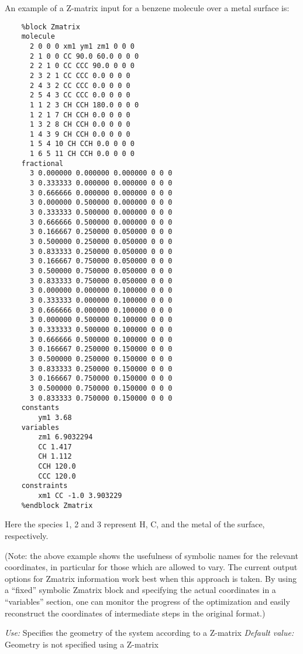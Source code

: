 \documentclass[11pt]{article}
\begin{document}
\begin{description}
An example of a Z-matrix input for a benzene molecule over a metal surface is:
\begin{verbatim}
    %block Zmatrix
    molecule
      2 0 0 0 xm1 ym1 zm1 0 0 0
      2 1 0 0 CC 90.0 60.0 0 0 0
      2 2 1 0 CC CCC 90.0 0 0 0
      2 3 2 1 CC CCC 0.0 0 0 0
      2 4 3 2 CC CCC 0.0 0 0 0
      2 5 4 3 CC CCC 0.0 0 0 0
      1 1 2 3 CH CCH 180.0 0 0 0
      1 2 1 7 CH CCH 0.0 0 0 0
      1 3 2 8 CH CCH 0.0 0 0 0
      1 4 3 9 CH CCH 0.0 0 0 0
      1 5 4 10 CH CCH 0.0 0 0 0
      1 6 5 11 CH CCH 0.0 0 0 0
    fractional
      3 0.000000 0.000000 0.000000 0 0 0
      3 0.333333 0.000000 0.000000 0 0 0
      3 0.666666 0.000000 0.000000 0 0 0
      3 0.000000 0.500000 0.000000 0 0 0
      3 0.333333 0.500000 0.000000 0 0 0
      3 0.666666 0.500000 0.000000 0 0 0
      3 0.166667 0.250000 0.050000 0 0 0
      3 0.500000 0.250000 0.050000 0 0 0
      3 0.833333 0.250000 0.050000 0 0 0
      3 0.166667 0.750000 0.050000 0 0 0
      3 0.500000 0.750000 0.050000 0 0 0
      3 0.833333 0.750000 0.050000 0 0 0
      3 0.000000 0.000000 0.100000 0 0 0
      3 0.333333 0.000000 0.100000 0 0 0
      3 0.666666 0.000000 0.100000 0 0 0
      3 0.000000 0.500000 0.100000 0 0 0
      3 0.333333 0.500000 0.100000 0 0 0
      3 0.666666 0.500000 0.100000 0 0 0
      3 0.166667 0.250000 0.150000 0 0 0
      3 0.500000 0.250000 0.150000 0 0 0
      3 0.833333 0.250000 0.150000 0 0 0
      3 0.166667 0.750000 0.150000 0 0 0
      3 0.500000 0.750000 0.150000 0 0 0
      3 0.833333 0.750000 0.150000 0 0 0
    constants
        ym1 3.68
    variables
        zm1 6.9032294
        CC 1.417
        CH 1.112
        CCH 120.0
        CCC 120.0
    constraints
        xm1 CC -1.0 3.903229
    %endblock Zmatrix
\end{verbatim}

Here the species 1, 2 and 3 represent H, C, and the metal of the
surface, respectively.

(Note: the above example shows the usefulness of symbolic names
for the relevant coordinates, in particular for those which are
allowed to vary. The current output options for Zmatrix information
work best when this approach is taken. By using a ``fixed'' symbolic
Zmatrix block and specifying the actual coordinates in a ``variables''
section, one can monitor the progress of the optimization and
easily reconstruct the coordinates of intermediate steps in the
original format.)

{\it Use:} Specifies the geometry of the system according to a Z-matrix
{\it Default value:} Geometry is not specified using a Z-matrix


\end{description}
\end{document}
